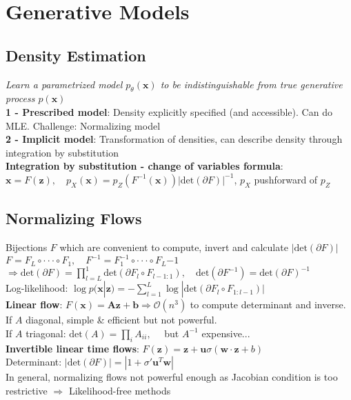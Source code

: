 \section*{Generative Models}
\subsection*{Density Estimation}
\textit{Learn a parametrized model $p_\theta(\mathbf x)$ to be indistinguishable from true generative process $p(\mathbf x)$}\\
\textbf{1 - Prescribed model}: Density explicitly specified (and accessible). Can do MLE. Challenge: Normalizing model\\
\textbf{2 - Implicit model}: Transformation of densities, can describe density through integration by substitution\\
\textbf{Integration by substitution - change of variables formula}:\\ $\mathbf x=F(\mathbf z), \quad p_X(\mathbf x)=p_Z(F^{-1}(\mathbf x))|\text{det}(\partial F)|^{-1}$, $p_X$ pushforward of $p_Z$
\subsection*{Normalizing Flows}
Bijections $F$ which are convenient to compute, invert and calculate $|\text{det}(\partial F)|$\\
$F=F_L\circ\cdot\cdot\cdot\circ F_1, \quad F^{-1}=F^{-1}_1\circ\cdot\cdot\cdot\circ F_L{-1}$\\
$\Rightarrow \text{det}(\partial F)=\prod_{l=L}^1\text{det}(\partial F_l\circ F_{l-1:1}), \quad \text{det}(\partial F^{-1})=\text{det}(\partial F)^{-1}$\\
Log-likelihood: $\log p(\mathbf x | \mathbf z)=-\sum_{l=1}^L\log |\text{det}(\partial F_l\circ F_{1:l-1})|$\\
\textbf{Linear flow}: $F(\mathbf x)=\mathbf{Az+b} \Rightarrow \mathcal O(n^3)$ to compute determinant and inverse. If $A$ diagonal, simple \& efficient but not powerful.\\
If $A$ triagonal: $\text{det}(A)=\prod_i A_{ii},\quad$ but $A^{-1}$ expensive...\\
\textbf{Invertible linear time flows}: $F(\mathbf z)=\mathbf z+\mathbf u\sigma(\mathbf{w\cdot z}+b)$ \\
Determinant: $|\text{det}(\partial F)|=|1+\sigma'\mathbf u^T\mathbf w|$\\
In general, normalizing flows not powerful enough as Jacobian condition is too restrictive $\Rightarrow$ Likelihood-free methods
